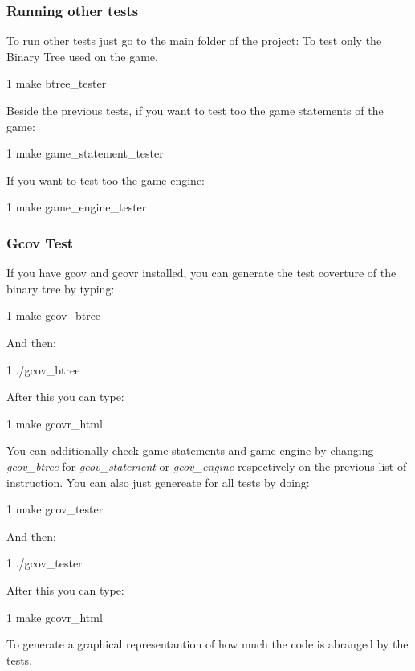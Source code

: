\subsubsection*{Running other tests}

To run other tests just go to the main folder of the project\+: To test only the Binary Tree used on the game. 
\begin{DoxyCode}
1 make btree\_tester
\end{DoxyCode}


Beside the previous tests, if you want to test too the game statements of the game\+: 
\begin{DoxyCode}
1 make game\_statement\_tester
\end{DoxyCode}


If you want to test too the game engine\+: 
\begin{DoxyCode}
1 make game\_engine\_tester
\end{DoxyCode}


\subsubsection*{Gcov Test}

If you have gcov and gcovr installed, you can generate the test coverture of the binary tree by typing\+: 
\begin{DoxyCode}
1 make gcov\_btree
\end{DoxyCode}
 And then\+: 
\begin{DoxyCode}
1 ./gcov\_btree
\end{DoxyCode}
 After this you can type\+: 
\begin{DoxyCode}
1 make gcovr\_html
\end{DoxyCode}


You can additionally check game statements and game engine by changing {\itshape gcov\+\_\+btree} for {\itshape gcov\+\_\+statement} or {\itshape gcov\+\_\+engine} respectively on the previous list of instruction. You can also just genereate for all tests by doing\+: 
\begin{DoxyCode}
1 make gcov\_tester
\end{DoxyCode}
 And then\+: 
\begin{DoxyCode}
1 ./gcov\_tester
\end{DoxyCode}
 After this you can type\+: 
\begin{DoxyCode}
1 make gcovr\_html
\end{DoxyCode}
 To generate a graphical representantion of how much the code is abranged by the tests.

